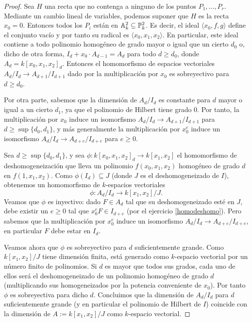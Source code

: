 \documentclass[ACGA.tex]{subfiles}
\begin{document}
\begin{proof}
 Sea $H$ una recta que no contenga a ninguno de los puntos $P_1,\ldots,P_r$. Mediante un cambio lineal de variables, podemos suponer que $H$ es la recta $x_0=0$. Entonces todos los $P_i$ están en $\mathbb{A}^2_k\subseteq\mathbb{P}^2_k$. Es decir, el ideal $\langle x_0,f,g \rangle$ define el conjunto vacío y por tanto su radical es $\langle x_0,x_1,x_2\rangle$. En particular, este ideal contiene a todo polinomio homogéneo de grado mayor o igual que un cierto $d_0$ o, dicho de otra forma, $I_d+x_0\cdot A_{d-1}=A_d$ para todo $d\geq d_0$, donde $A_d=k[x_0,x_1,x_2]_d$. Entonces el homomorfismo de espacios vectoriales $A_{d}/I_{d}\to A_{d+1}/I_{d+1}$ dado por la multiplicación por $x_0$ es sobreyectivo para $d\geq d_0$.

Por otra parte, sabemos que la dimensión de $A_d/I_d$ es constante para $d$ mayor o igual a un cierto $d_1$, ya que el polinomio de Hilbert tiene grado $0$. Por tanto, la multiplicación por $x_0$ induce un isomorfismo $A_{d}/I_{d}\to A_{d+1}/I_{d+1}$ para $d\geq\sup\{d_0,d_1\}$, y más generalmente la multiplicación por $x_0^e$ induce un isomorfismo $A_d/I_d\to A_{d+e}/I_{d+e}$ para $e\geq 0$.

Sea $d\geq\sup\{d_0,d_1\}$, y sea $\phi:k[x_0,x_1,x_2]_d\to k[x_1,x_2]$ el homomorfismo de deshomogeneización que lleva un polinomio $f(x_0,x_1,x_2)$ homogéneo de grado $d$ en $f(1,x_1,x_2)$. Como $\phi(I_d)\subseteq J$ (donde $J$ es el deshomogeneizado de $I$), obtenemos un homomorfismo de $k$-espacios vectoriales
$$
\phi:A_d/I_d\to k[x_1,x_2]/J.
$$
Veamos que $\phi$ es inyectivo: dado $F\in A_d$ tal que su deshomogeneizado esté en $J$, debe existir un $e\geq 0$ tal que $x_0^eF\in I_{d+e}$ (por el ejercicio \ref{homodeshomo}). Pero sabemos que la multiplicación por $x_0^e$ induce un isomorfismo $A_d/I_d\to A_{d+e}/I_{d+e}$, en particular $F$ debe estar en $I_d$.

Veamos ahora que $\phi$ es sobreyectivo para $d$ suficientemente grande. Como $k[x_1,x_2]/J$ tiene dimensión finita, está generado como $k$-espacio vectorial por un número finito de polinomios. Si $d$ es mayor que todos sus grados, cada uno de ellos será el deshomogeneizado de un polinomio homogéneo de grado $d$ (multiplicando sus homogeneizados por la potencia conveniente de $x_0$). Por tanto $\phi$ es sobreyectiva para dicho $d$. Concluimos que la dimensión de $A_d/I_d$ para $d$ suficientemente grande (y en particular el polinomio de Hilbert de $I$) coincide con la dimensión de $A:=k[x_1,x_2]/J$ como $k$-espacio vectorial.


\end{proof}
\end{document}

